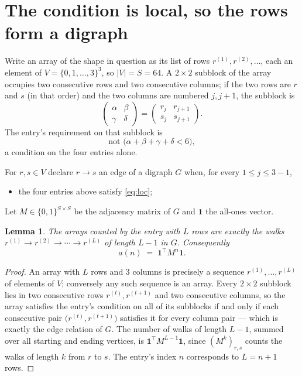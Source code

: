 \documentclass[11pt,a4paper]{article}
\theoremstyle{plain}
\newtheorem{lemma}[theorem]{Lemma}
\theoremstyle{definition}
\begin{document}
\section{The condition is local, so the rows form a digraph}

Write an array of the shape in question as its list of rows
$r^{(1)},r^{(2)},\dots$, each an element of
$V=\{0,1,\dots,3\}^{3}$, so $|V|=S=64$. A $2\times2$ subblock of the array
occupies two consecutive rows and two consecutive columns; if the two rows are $r$
and $s$ (in that order) and the two columns are numbered $j,j+1$,
the subblock is
\[
\begin{pmatrix}\alpha&\beta\\\gamma&\delta\end{pmatrix}=\begin{pmatrix}r_j&r_{j+1}\\s_j&s_{j+1}\end{pmatrix}.
\]
The entry's requirement on that subblock is
\begin{equation}\label{eq:loc}
\text{not }\bigl(\alpha+\beta+\gamma+\delta<6\bigr),
\end{equation}
a condition on the four entries alone.

For $r,s\in V$ declare $r\to s$ an edge of a digraph $G$ when, for every
$1\le j\le 3-1$,
\begin{itemize}
\item the four entries above satisfy \eqref{eq:loc};

\end{itemize}
Let $M\in\{0,1\}^{S\times S}$ be the adjacency matrix of $G$ and $\mathbf{1}$ the
all-ones vector.

\begin{lemma}\label{lem:walk}
The arrays counted by the entry with $L$ rows are exactly the walks
$r^{(1)}\to r^{(2)}\to\cdots\to r^{(L)}$ of length $L-1$ in $G$. Consequently
\[
a(n)\;=\;\mathbf{1}^{\!\top}M^{n}\mathbf{1} .
\]
\end{lemma}

\begin{proof}
An array with $L$ rows and $3$ columns is precisely a sequence
$r^{(1)},\dots,r^{(L)}$ of elements of $V$; conversely any such sequence is an array.
Every $2\times2$ subblock lies in two consecutive rows $r^{(t)},r^{(t+1)}$ and two
consecutive columns, so the array satisfies the entry's condition on all of its subblocks
if and only if each consecutive pair $\bigl(r^{(t)},r^{(t+1)}\bigr)$ satisfies it for
every column pair --- which is exactly the edge relation of $G$. The number of walks of
length $L-1$, summed over all starting and ending vertices, is
$\mathbf{1}^{\!\top}M^{L-1}\mathbf{1}$, since $(M^{k})_{r,s}$ counts the walks of
length $k$ from $r$ to $s$. The entry's index $n$ corresponds to $L=n+1$ rows.
\end{proof}
\end{document}

